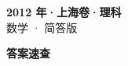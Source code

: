 \documentclass[zihao=-4, a4paper]{ctexart}
\begin{document}
\begin{center}
  {\Large\bfseries 2012 年·上海卷·理科}\\[4pt]
  {\large 数学 · 简答版}
\end{center}
\medskip
{}

\clearpage
{}
\begin{center}{\Large\bfseries 答案速查}\end{center}
\medskip

\end{document}
